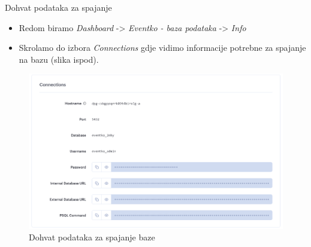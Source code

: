 \begin{packed_enum}
				\item Dohvat podataka za spajanje
				\begin{itemize}
					\item Redom biramo \textit{Dashboard} -> \textit{Eventko - baza podataka} -> \textit{Info}
					\item Skrolamo do izbora \textit{Connections} gdje vidimo informacije potrebne za spajanje na bazu (slika ispod).
				\end{itemize}
				\begin{figure}[H]
					\includegraphics[width=\textwidth]{Opis deploymenta/Slika2.png}
					\caption{Dohvat podataka za spajanje baze}
				\end{figure}
			

\end{packed_enum}
